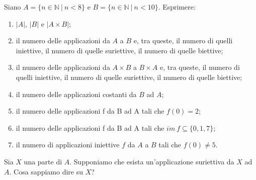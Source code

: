 \begin{exsbox}
	Siano $A=\{n \in \mathbb{N} \ | \ n < 8\}$ e $B=\{n \in \mathbb{N} \ | \ n < 10 \}$. Esprimere:
	\begin{enumerate}
		\item $|A|$, $|B|$ e $|A \times B|$;
		\item il numero delle applicazioni da $A$ a $B$ e, tra queste, il numero di quelli iniettive, il numero di quelle suriettive, il numero di quelle biettive;
		\item il numero delle applicazioni da $A \times B$ a $B \times A$ e, tra queste, il numero di quelli iniettive, il numero di quelle suriettive, il numero di quelle biettive;
		\item il numero delle applicazioni costanti da $B$ ad $A$;
		\item il numero delle applicazioni f da B ad A tali che $f(0)=2$;
		\item il numero delle applicazioni f da B ad A tali che $im \ f \subseteq \{0,1,7\}$;
		\item il numero di applicazioni iniettive $f$ da $A$ a $B$ tali che $f(0) \neq 5$.
	\end{enumerate}
	Sia $X$ una parte di $A$. Supponiamo che esista un'applicazione suriettiva da $X$ ad $A$. Cosa sappiamo dire su $X$?
\end{exsbox}
